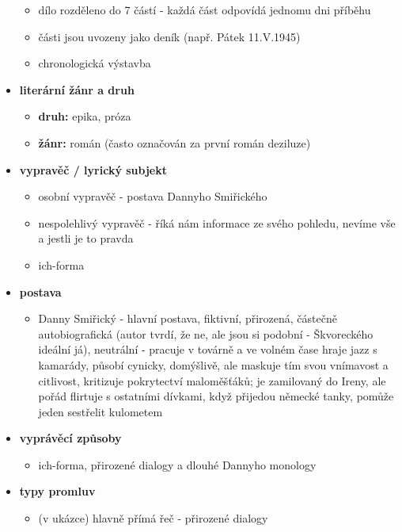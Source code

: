 \documentclass[11pt]{article}
\begin{document}
\begin{itemize}
\begin{itemize}
            \item dílo rozděleno do 7 částí - každá část odpovídá jednomu dni příběhu
            \item části jsou uvozeny jako deník (např. Pátek 11.V.1945)
            \item chronologická výstavba
        \end{itemize}
        \item\textbf{literární žánr a druh}
        \begin{itemize}
            \item\textbf{druh: }epika, próza
            \item\textbf{žánr: }román (často označován za první román deziluze)
        \end{itemize}
        \item\textbf{vypravěč / lyrický subjekt}
        \begin{itemize}
            \item osobní vypravěč - postava Dannyho Smiřického
            \item nespolehlivý vypravěč - říká nám informace ze svého pohledu, nevíme vše a jestli je to pravda
            \item ich-forma
        \end{itemize}
        \item\textbf{postava}
        \begin{itemize}
            \item Danny Smiřický - hlavní postava, fiktivní, přirozená, částečně autobiografická (autor tvrdí, že ne, ale jsou si podobní - Škvoreckého ideální já), neutrální - pracuje v továrně a ve volném čase hraje jazz s kamarády, působí cynicky, domýšlivě, ale maskuje tím svou vnímavost a citlivost, kritizuje pokrytectví maloměšťáků; je zamilovaný do Ireny, ale pořád flirtuje s ostatními dívkami, když přijedou německé tanky, pomůže jeden sestřelit kulometem
        \end{itemize}
        \item\textbf{vyprávěcí způsoby}
        \begin{itemize}
            \item ich-forma, přirozené dialogy a dlouhé Dannyho monology
        \end{itemize}
        \item\textbf{typy promluv}
        \begin{itemize}
            \item (v ukázce) hlavně přímá řeč - přirozené dialogy

\end{itemize}
\end{itemize}
\end{document}
